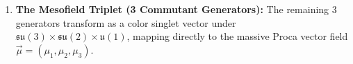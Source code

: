 \documentclass[
    12pt,
    a4paper,
    headings=normal,
    twoside=false,
    open=any,
    parskip=half
]{scrbook}
\newcommand{\iu}{\mathrm{i}}
\begin{document}
\begin{phystheorem}
\begin{enumerate}[label=(\alph*), noitemsep]
\begin{equation}
    T_1^{(L)} \;\coloneqq\; \frac{1}{2}\begin{pmatrix} 0 & 0 & 0 & 1 \\ 0 & 0 & 0 & 0 \\ 0 & 0 & 0 & 0 \\ 1 & 0 & 0 & 0 \end{pmatrix}, \quad T_2^{(L)} \;\coloneqq\; \frac{1}{2}\begin{pmatrix} 0 & 0 & 0 & -\iu \\ 0 & 0 & 0 & 0 \\ 0 & 0 & 0 & 0 \\ \iu & 0 & 0 & 0 \end{pmatrix}, \quad T_3^{(L)} \;\coloneqq\; \frac{1}{2}\begin{pmatrix} 1 & 0 & 0 & 0 \\ 0 & 0 & 0 & 0 \\ 0 & 0 & 0 & 0 \\ 0 & 0 & 0 & -1 \end{pmatrix}
    \end{equation}
    \item \textbf{The Mesofield Triplet (3 Commutant Generators):} The remaining 3 generators transform as a color singlet vector under $\mathfrak{su}(3) \times \mathfrak{su}(2) \times \mathfrak{u}(1)$, mapping directly to the massive Proca vector field $\vec{\mu} = (\mu_1, \mu_2, \mu_3)$.
\end{enumerate}
\end{phystheorem}
\end{document}
